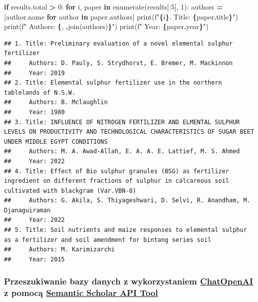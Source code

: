 \documentclass[
  12pt,
]{article}
\newenvironment{Shaded}{\begin{snugshade}}{\end{snugshade}}
\newcommand{\BuiltInTok}[1]{#1}
\newcommand{\ControlFlowTok}[1]{\textcolor[rgb]{0.13,0.29,0.53}{\textbf{#1}}}
\newcommand{\DecValTok}[1]{\textcolor[rgb]{0.00,0.00,0.81}{#1}}
\newcommand{\KeywordTok}[1]{\textcolor[rgb]{0.13,0.29,0.53}{\textbf{#1}}}
\newcommand{\NormalTok}[1]{#1}
\newcommand{\OperatorTok}[1]{\textcolor[rgb]{0.81,0.36,0.00}{\textbf{#1}}}
\newcommand{\SpecialCharTok}[1]{\textcolor[rgb]{0.81,0.36,0.00}{\textbf{#1}}}
\newcommand{\SpecialStringTok}[1]{\textcolor[rgb]{0.31,0.60,0.02}{#1}}
\newcommand{\StringTok}[1]{\textcolor[rgb]{0.31,0.60,0.02}{#1}}
\begin{document}
\begin{Shaded}
\begin{Highlighting}[]
\ControlFlowTok{if}\NormalTok{ results.total }\OperatorTok{\textgreater{}} \DecValTok{0}\NormalTok{:}
    \ControlFlowTok{for}\NormalTok{ i, paper }\KeywordTok{in} \BuiltInTok{enumerate}\NormalTok{(results[:}\DecValTok{5}\NormalTok{], }\DecValTok{1}\NormalTok{):}
\NormalTok{        authors }\OperatorTok{=}\NormalTok{ [author.name }\ControlFlowTok{for}\NormalTok{ author }\KeywordTok{in}\NormalTok{ paper.authors]}
        \BuiltInTok{print}\NormalTok{(}\SpecialStringTok{f"}\SpecialCharTok{\{}\NormalTok{i}\SpecialCharTok{\}}\SpecialStringTok{. Title: }\SpecialCharTok{\{}\NormalTok{paper}\SpecialCharTok{.}\NormalTok{title}\SpecialCharTok{\}}\SpecialStringTok{"}\NormalTok{)}
        \BuiltInTok{print}\NormalTok{(}\SpecialStringTok{f"    Authors: }\SpecialCharTok{\{}\StringTok{\textquotesingle{}, \textquotesingle{}}\SpecialCharTok{.}\NormalTok{join(authors)}\SpecialCharTok{\}}\SpecialStringTok{"}\NormalTok{)}
        \BuiltInTok{print}\NormalTok{(}\SpecialStringTok{f"    Year: }\SpecialCharTok{\{}\NormalTok{paper}\SpecialCharTok{.}\NormalTok{year}\SpecialCharTok{\}}\SpecialStringTok{"}\NormalTok{)}
\end{Highlighting}
\end{Shaded}

\begin{verbatim}
## 1. Title: Preliminary evaluation of a novel elemental sulphur fertilizer
##     Authors: D. Pauly, S. Strydhorst, E. Bremer, M. Mackinnon
##     Year: 2019
## 2. Title: Elemental sulphur fertilizer use in the northern tablelands of N.S.W.
##     Authors: B. Mclaughlin
##     Year: 1980
## 3. Title: INFLUENCE OF NITROGEN FERTILIZER AND ELMENTAL SULPHUR LEVELS ON PRODUCTIVITY AND TECHNOLOGICAL CHARACTERISTICS OF SUGAR BEET UNDER MIDDLE EGYPT CONDITIONS
##     Authors: M. A. Awad-Allah, E. A. A. E. Lattief, M. S. Ahmed
##     Year: 2022
## 4. Title: Effect of Bio sulphur granules (BSG) as fertilizer ingredient on different fractions of sulphur in calcareous soil cultivated with blackgram (Var.VBN-8)
##     Authors: G. Akila, S. Thiyageshwari, D. Selvi, R. Anandham, M. Djanaguiraman
##     Year: 2022
## 5. Title: Soil nutrients and maize responses to elemental sulphur as a fertilizer and soil amendment for bintang series soil
##     Authors: M. Karimizarchi
##     Year: 2015
\end{verbatim}

\hypertarget{przeszukiwanie-bazy-danych-z-wykorzystaniem-chatopenai-z-pomocux105-semantic-scholar-api-tool}{%
\subsubsection{\texorpdfstring{Przeszukiwanie bazy danych z
wykorzystaniem \href{https://platform.openai.com/apps}{ChatOpenAI} z
pomocą
\href{https://python.langchain.com/docs/integrations/tools/semanticscholar}{Semantic
Scholar API
Tool}}{Przeszukiwanie bazy danych z wykorzystaniem ChatOpenAI z pomocą Semantic Scholar API Tool}}\label{przeszukiwanie-bazy-danych-z-wykorzystaniem-chatopenai-z-pomocux105-semantic-scholar-api-tool}}
\end{document}
